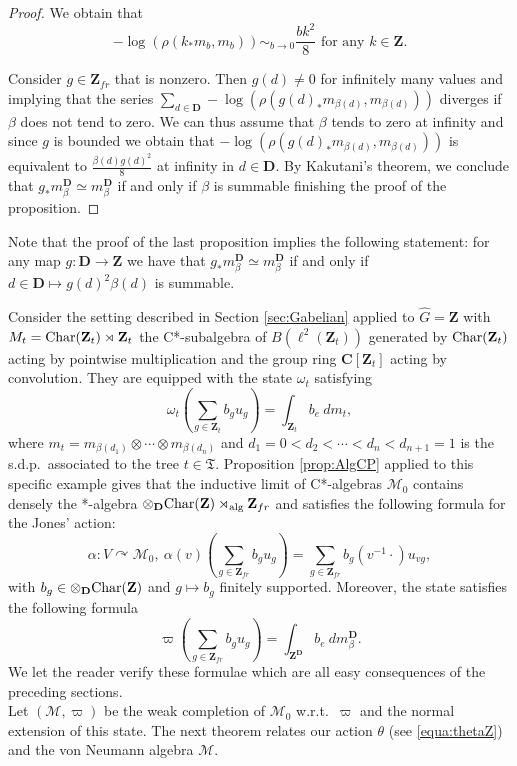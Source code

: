 \documentclass[a4paper,12pt]{amsart}
\numberwithin{equation}{section}
\theoremstyle{definition}
\newcommand{\act}{\curvearrowright}
\newcommand{\al}{\alpha}
\DeclareMathOperator{\alg}{alg}
\newcommand{\C}{\mathbf C}
\newcommand{\Ch}{\textup{Char}}
\newcommand{\D}{\mathbf D}
\newcommand{\scrM}{\mathscr M}
\newcommand{\mbD}{m_\beta^\D}
\newcommand{\ot}{\otimes}\newcommand{\otmin}{\otimes_{\text{min}}}
\newcommand{\fT}{\mathfrak T}
\newcommand{\wh}{\widehat}
\newcommand{\Z}{\mathbf{Z}}
\begin{document}
\begin{proof}
We obtain that 
\begin{equation}\label{equa:logrho}
-\log(\rho(k_*m_b, m_b)) \sim_{b\to 0} \dfrac{bk^2}{8} \text{ for any } k\in\Z.\end{equation}

Consider $g\in\Z_{fr}$ that is nonzero.
Then $g(d)\neq0$ for infinitely many values and implying that the series $\sum_{d\in\D} -\log(\rho(g(d)_*m_{\beta(d)}, m_{\beta(d)}))$ diverges if $\beta$ does not tend to zero.
We can thus assume that $\beta$ tends to zero at infinity and since $g$ is bounded we obtain that $-\log(\rho(g(d)_*m_{\beta(d)}, m_{\beta(d)}))$ is equivalent to $\tfrac{\beta(d)g(d)^2}{8}$ at infinity in $d\in\D$.
By Kakutani's theorem, we conclude that $g_*m_\beta^\D \simeq m_\beta^\D$ if and only if $\beta$ is summable finishing the proof of the proposition.
\end{proof}

Note that the proof of the last proposition implies the following statement: 
for any map $g:\D\to \Z$ we have that $g_*m_\beta^\D\simeq \mbD$ if and only if $d\in\D\mapsto g(d)^2 \beta(d)$ is summable.

Consider the setting described in Section \ref{sec:Gabelian} applied to $\wh G = \Z$ with $M_t=\Ch(\Z_t)\rtimes \Z_t$ the C*-subalgebra of $B(\ell^2(\Z_t))$ generated by $\Ch(\Z_t)$ acting by pointwise multiplication and the group ring $\C[\Z_t]$ acting by convolution.
They are equipped with the state $\omega_t$ satisfying
$$\omega_t\left( \sum_{g\in\Z_t} b_g u_g \right) = \int_{\Z_t} b_e \ dm_t,$$
where $m_t = m_{\beta(d_1)}\ot\cdots \ot m_{\beta(d_n)}$ and $d_1=0<d_2<\cdots< d_n<d_{n+1} = 1$ is the s.d.p.~associated to the tree $t\in\fT$.
Proposition \ref{prop:AlgCP} applied to this specific example gives that the inductive limit of C*-algebras $\scrM_0$ contains densely the *-algebra $\ot_\D\Ch(\Z)\rtimes_{\alg} \Z_{fr}$ and satisfies the following formula for the Jones' action:  
$$\al:V\act \scrM_0, \ \al(v)(\sum_{g\in\Z_{fr}} b_g u_g) = \sum_{g\in\Z_{fr}} b_g(v^{-1}\cdot ) u_{vg},$$
with $b_g\in \ot_\D\Ch(\Z)$ and $g\mapsto b_g$ finitely supported.
Moreover, the state satisfies the following formula
$$\varpi\left( \sum_{g\in\Z_{fr}} b_g u_g \right) = \int_{\Z^\D} b_e \ d \mbD.$$
We let the reader verify these formulae which are all easy consequences of the preceding sections.\\[0.1cm]
Let $(\scrM,\varpi)$ be the weak completion of $\scrM_0$ w.r.t.~$\varpi$ and the normal extension of this state.
The next theorem relates our action $\theta$ (see \eqref{equa:thetaZ}) and the von Neumann algebra $\scrM$.
\end{document}
